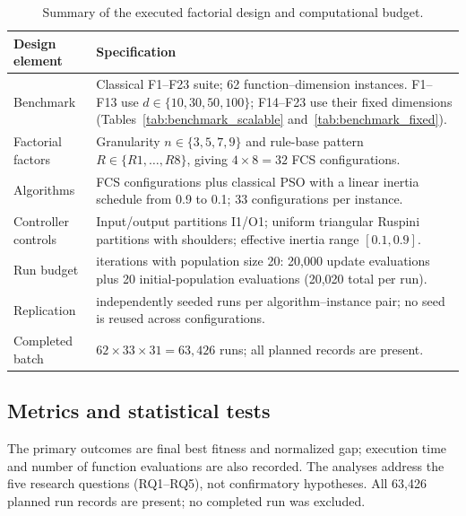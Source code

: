 \begin{table}[H]
\centering
\small
\caption{Summary of the executed factorial design and computational budget.}
\label{tab:experimental_design_summary}
\begin{tabularx}{\textwidth}{l>{\raggedright\arraybackslash}X}
\toprule
\textbf{Design element} & \textbf{Specification} \\
\midrule
Benchmark & Classical F1--F23 suite; 62 function--dimension instances. F1--F13 use $d\in\{10,30,50,100\}$; F14--F23 use their fixed dimensions (Tables~\ref{tab:benchmark_scalable} and~\ref{tab:benchmark_fixed}). \\
Factorial factors & Granularity $n\in\{3,5,7,9\}$ and rule-base pattern $R\in\{R1,\ldots,R8\}$, giving $4\times8=32$ FCS configurations. \\
Algorithms & 32 FCS configurations plus classical PSO with a linear inertia schedule from 0.9 to 0.1; 33 configurations per instance. \\
Controller controls & Input/output partitions I1/O1; uniform triangular Ruspini partitions with shoulders; effective inertia range $[0.1,0.9]$. \\
Run budget & 1000 iterations with population size 20: 20,000 update evaluations plus 20 initial-population evaluations (20,020 total per run). \\
Replication & 31 independently seeded runs per algorithm--instance pair; no seed is reused across configurations. \\
Completed batch & $62\times33\times31=63{,}426$ runs; all planned records are present. \\
\bottomrule
\end{tabularx}
\end{table}

\subsection{Metrics and statistical tests}
\label{subsec:metrics}

The primary outcomes are final best fitness and normalized gap; execution time and number of function evaluations are also recorded. The analyses address the five research questions (RQ1--RQ5), not confirmatory hypotheses. All 63,426 planned run records are present; no completed run was excluded.

